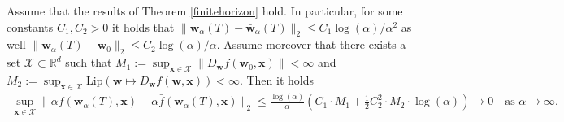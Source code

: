 \documentclass{article}
\newenvironment{manualproposition}[1]{%
  \renewcommand\themanualpropositioninner{#1}%
  \manualpropositioninner
}{\endmanualtheoreminner}
\begin{document}
\begin{manualproposition}{A.1}\label{generalization}
Assume that the results of Theorem \ref{finitehorizon} hold. In particular, for some constants $C_1, C_2 > 0$ it holds that $\| \boldsymbol{w}_{\alpha}(T) - \boldsymbol{\bar{w}}_{\alpha}(T) \|_2 \leq C_1\log(\alpha)/\alpha^2$ as well $\| \boldsymbol{w}_{\alpha}(T) - \boldsymbol{w}_0 \|_2 \leq C_2\log(\alpha)/\alpha$. Assume moreover that there exists a set $\mathcal{X} \subset \mathbb{R}^d$ such that $M_1 := \sup_{\boldsymbol{x} \in \mathcal{X}} \| D_{\boldsymbol{w}}f(\boldsymbol{w}_0, \boldsymbol{x}) \| < \infty$ and $M_2 := \sup_{\boldsymbol{x} \in \mathcal{X}} \text{Lip}( \boldsymbol{w} \mapsto D_{\boldsymbol{w}}f(\boldsymbol{w}, \boldsymbol{x})) < \infty$. Then it holds 
\begin{align*}
    \sup_{\boldsymbol{x} \in \mathcal{X}} \| \alpha f(\boldsymbol{w}_{\alpha}(T), \boldsymbol{x}) - \alpha \bar{f}(\boldsymbol{\bar{w}}_{\alpha}(T), \boldsymbol{x}) \|_2 \leq \frac{\log(\alpha)}{\alpha}\left(C_1 \cdot M_1 + \frac{1}{2}C_2^2 \cdot M_2 \cdot \log(\alpha) \right) \longrightarrow 0 \quad \text{as $\alpha \longrightarrow \infty$}.
\end{align*}
\end{manualproposition}
\end{document}
